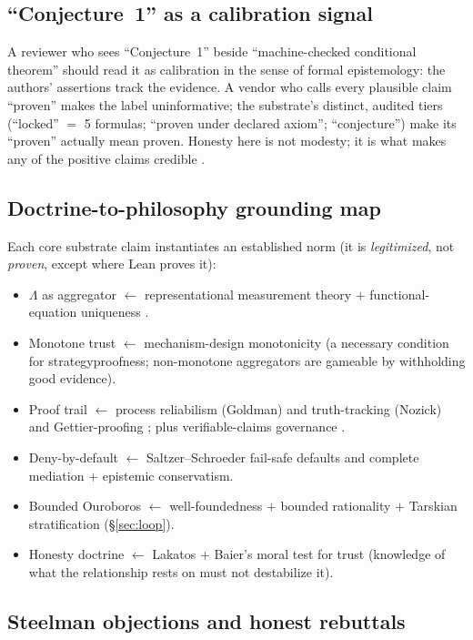 \documentclass[11pt]{article}
\theoremstyle{plain}
\theoremstyle{definition}
\theoremstyle{remark}
\newcommand{\La}{\Lambda}
\begin{document}
\subsection{``Conjecture~1'' as a calibration signal}
A reviewer who sees ``Conjecture~1'' beside ``machine-checked conditional theorem''
should read it as calibration in the sense of formal epistemology: the authors'
assertions track the evidence. A vendor who calls every plausible claim ``proven''
makes the label uninformative; the substrate's distinct, audited tiers (``locked''
$=$ 5 formulas; ``proven under declared axiom''; ``conjecture'') make its ``proven''
actually mean proven. Honesty here is not modesty; it is what makes any of the
positive claims credible \cite{reliabilism}.

\subsection{Doctrine-to-philosophy grounding map}
Each core substrate claim instantiates an established norm (it is \emph{legitimized},
not \emph{proven}, except where Lean proves it):
\begin{itemize}[leftmargin=1.6em,itemsep=2pt]
  \item $\La$ as aggregator $\leftarrow$ representational measurement theory
    \cite{foundmeas} $+$ functional-equation uniqueness \cite{aczel1948,csato2018}.
  \item Monotone trust $\leftarrow$ mechanism-design monotonicity (a necessary
    condition for strategyproofness; non-monotone aggregators are gameable by
    withholding good evidence).
  \item Proof trail $\leftarrow$ process reliabilism (Goldman) and truth-tracking
    (Nozick) and Gettier-proofing \cite{reliabilism,nozick,gettier};
    plus verifiable-claims governance \cite{brundage2020}.
  \item Deny-by-default $\leftarrow$ Saltzer--Schroeder fail-safe defaults and
    complete mediation \cite{saltzer1975} $+$ epistemic conservatism.
  \item Bounded Ouroboros $\leftarrow$ well-foundedness $+$ bounded rationality $+$
    Tarskian stratification (\S\ref{sec:loop}).
  \item Honesty doctrine $\leftarrow$ Lakatos \cite{lakatos} $+$ Baier's moral test
    for trust (knowledge of what the relationship rests on must not destabilize it).
\end{itemize}

\subsection{Steelman objections and honest rebuttals}
\end{document}
